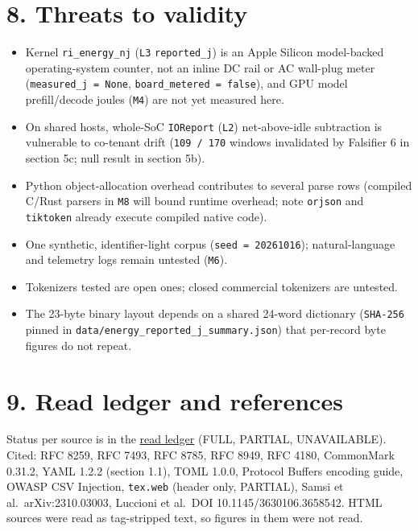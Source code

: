 \documentclass[10pt,letterpaper]{article}
\providecommand{\tightlist}{\setlength{\itemsep}{1pt}\setlength{\parskip}{0pt}}
\begin{document}
\section{8. Threats to validity}\label{threats-to-validity}

\begin{itemize}
\tightlist
\item
  Kernel \texttt{ri\_energy\_nj} (\texttt{L3} \texttt{reported\_j}) is
  an Apple Silicon model-backed operating-system counter, not an inline
  DC rail or AC wall-plug meter (\texttt{measured\_\allowbreak{}j\ =\ None},
  \texttt{board\_\allowbreak{}metered\ =\ false}), and GPU model prefill/decode
  joules (\texttt{M4}) are not yet measured here.
\item
  On shared hosts, whole-SoC \texttt{IOReport} (\texttt{L2})
  net-above-idle subtraction is vulnerable to co-tenant drift
  (\texttt{109\ /\ 170} windows invalidated by Falsifier 6 in section
  5c; null result in section 5b).
\item
  Python object-allocation overhead contributes to several parse rows
  (compiled C/Rust parsers in \texttt{M8} will bound runtime overhead;
  note \texttt{orjson} and \texttt{tiktoken} already execute compiled
  native code).
\item
  One synthetic, identifier-light corpus (\texttt{seed\ =\ 20261016});
  natural-language and telemetry logs remain untested (\texttt{M6}).
\item
  Tokenizers tested are open ones; closed commercial tokenizers are
  untested.
\item
  The 23-byte binary layout depends on a shared 24-word dictionary
  (\texttt{SHA-256} pinned in
  \texttt{data/\allowbreak{}energy\_\allowbreak{}reported\_\allowbreak{}j\_\allowbreak{}summary.\allowbreak{}json}) that per-record byte
  figures do not repeat.
\end{itemize}

\section{9. Read ledger and
references}\label{read-ledger-and-references}

Status per source is in the
\href{https://research.openie.dev/living/ai-reads-human/READ_LEDGER.md}{read
ledger} (FULL, PARTIAL, UNAVAILABLE). Cited: RFC 8259, RFC 7493, RFC
8785, RFC 8949, RFC 4180, CommonMark 0.31.2, YAML 1.2.2 (section 1.1),
TOML 1.0.0, Protocol Buffers encoding guide, OWASP CSV Injection,
\texttt{tex.web} (header only, PARTIAL), Samsi et al.~arXiv:2310.03003,
Luccioni et al.~DOI 10.1145/3630106.3658542. HTML sources were read as
tag-stripped text, so figures in them were not read.
\end{document}
